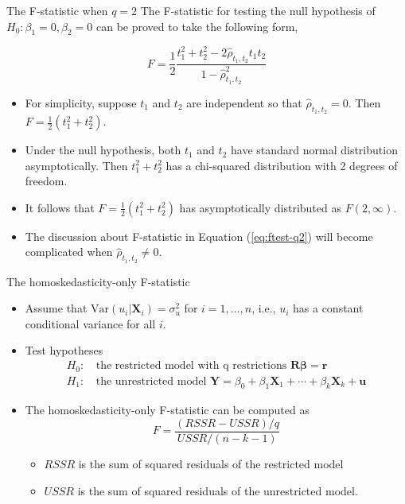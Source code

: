 \documentclass[presentation,10pt]{beamer}
\newcommand{\var}{\mathrm{Var}}
\begin{document}
\begin{frame}[label={sec:orgcbdf97a}]{The F-statistic when \(q=2\)}
The F-statistic for testing the null hypothesis of \(H_0: \beta_1 = 0,
\beta_2 = 0\) can be proved to take the following form,

\begin{equation}
\label{eq:ftest-q2}
F = \frac{1}{2}\frac{t_1^2 + t_2^2 - 2 \hat{\rho}_{t_1,t_2}t_1t_2}{1 - \hat{\rho}_{t_1,t_2}^2}
\end{equation}

\begin{itemize}
\item For simplicity, suppose \(t_1\) and \(t_2\) are independent so that
\(\hat{\rho}_{t_1,t_2} = 0\). Then \(F = \frac{1}{2}(t_1^2 +
  t_2^2)\).
\item Under the null hypothesis, both \(t_1\) and \(t_2\) have standard normal
distribution asymptotically. Then \(t^2_1 + t^2_2\) has a chi-squared
distribution with 2 degrees of freedom.
\item It follows that \(F = \frac{1}{2}(t^2_1 + t^2_2)\) has asymptotically
distributed as \(F(2, \infty)\).
\item The discussion about F-statistic in Equation (\ref{eq:ftest-q2})
will become complicated when \(\hat{\rho}_{t_1,t_2} \neq 0\).
\end{itemize}
\end{frame}

\begin{frame}[label={sec:org98ca903}]{The homoskedasticity-only F-statistic}
\begin{itemize}
\item Assume that \(\var(u_i | \mathbf{X}_i) = \sigma^2_u\) for \(i
  = 1, \ldots, n\), i.e., \(u_i\) has a constant conditional variance for
all \(i\).
\item Test hypotheses
\begin{align*}
H_0:\, & \text{the restricted model with q restrictions } \mathbf{R}\boldsymbol{\beta} = \mathbf{r}  \\
H_1:\, & \text{the unrestricted model } \mathbf{Y} = \beta_0 + \beta_{1} \mathbf{X}_{1} + \cdots + \beta_k \mathbf{X}_k + \mathbf{u}
\end{align*}
\item The \alert{homoskedasticity-only} F-statistic can be computed as
\begin{equation}
\label{eq:ftest-hm}
F = \frac{(RSSR - USSR)/q}{USSR/(n-k-1)}
\end{equation}
\begin{itemize}
\item \(RSSR\) is the sum of squared residuals of the restricted model
\item \(USSR\) is the sum of squared residuals of the unrestricted model.
\end{itemize}
\end{itemize}
\end{frame}
\end{document}
